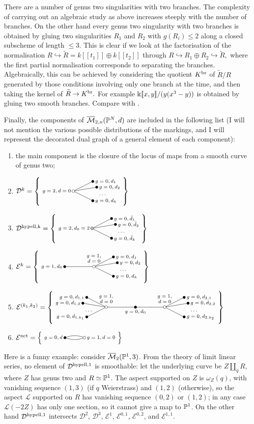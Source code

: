 \begin{rmk}
 There are a number of genus two singularities with two branches. The complexity of carrying out an algebraic study as above increases steeply with the number of branches. On the other hand every genus two singularity with two branches is obtained by gluing two singularities $R_1$ and $R_2$ with $g(R_i)\leq 2$ along a closed subscheme of length $\leq 3$.
 This is clear if we look at the factorisation of the normalisation $R\hookrightarrow \widetilde{R}=k[\![t_1]\!]\oplus k[\![t_2]\!]$ through $R\hookrightarrow R_1\oplus R_2\hookrightarrow \widetilde{R},$ where 
 the first partial normalisation corresponds to separating the branches. Algebraically, this can be achieved by considering the quotient $K^{\rm{br}}$ of $\widetilde{R}/R$ generated by those conditions involving only one branch at the time, and then taking the kernel of $\widetilde{R}\to K^{\rm{br}}.$ For example $\kk[\![x,y]\!]/(y(x^3-y))$ is obtained by gluing two smooth branches. Compare with \cite[Appendix A]{SMYtowards}.
\end{rmk}

Finally, the components of $\M{2}{n}{\PP^N}{d}$ are included in the following list (I will not mention the various possible distributions of the markings, and I will represent the decorated dual graph of a general element of each component):
\begin{enumerate}
 \item the main component is the closure of the locus of maps from a smooth curve of genus two;
 \item $\mathcal D^k=\left\{\Dk\right\}$
  \item $\mathcal D^{\rm{hypell},k}=\left\{\hypell\right\}$
 \item $\mathcal E^k=\left\{\Ek\right\}$
 \item $\mathcal E^{(k_1,k_2)}=\left\{\Ekk\right\}$
 \item $\mathcal E^{\rm{nct}}=\left\{\pacman\right\}$
\end{enumerate}
Here is a funny example: consider $\oM_2(\PP^1,3)$. From the theory of limit linear series, no element of $\mathcal D^{\rm{hypell},1}$ is smoothable: let the underlying curve be $Z\coprod_q R$, where $Z$ has genus two and $R\simeq\PP^1$. The aspect supported on $Z$ is $\omega_Z(q)$, with vanishing sequence $(1,3)$ (if $q$ Weierstrass) and $(1,2)$ (otherwise), so the aspect $\mathcal L$ supported on $R$ has vanishing sequence $(0,2)$ or $(1,2)$; in any case $\mathcal L(-2Z)$ has only one section, so it cannot give a map to $\PP^1$. On the other hand $\mathcal D^{\rm{hypell},1}$ intersects $\mathcal D^2$, $\mathcal D^3$, $\mathcal E^1$, $\mathcal E^{0,1}$, $\mathcal E^{0,2}$, and $\mathcal E^{1,1}$. 

